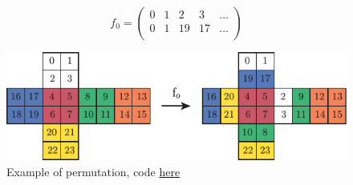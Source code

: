 
\begin{itemize}
    \begin{equation*}
        f_0 = \begin{pmatrix}
            0 & 1 & 2 & 3 & \ldots\\
            0 & 1 & 19 & 17 & \ldots\\
        \end{pmatrix}
    \end{equation*}
\end{itemize}

\begin{figure}[h]
    \centering
    \includegraphics{imgs/pAsset 1.pdf} \vspace{5mm}
    \caption{Example of permutation, code \href{https://www.kaggle.com/code/marksix/visualize-allowed-moves}{here}}
\end{figure}
